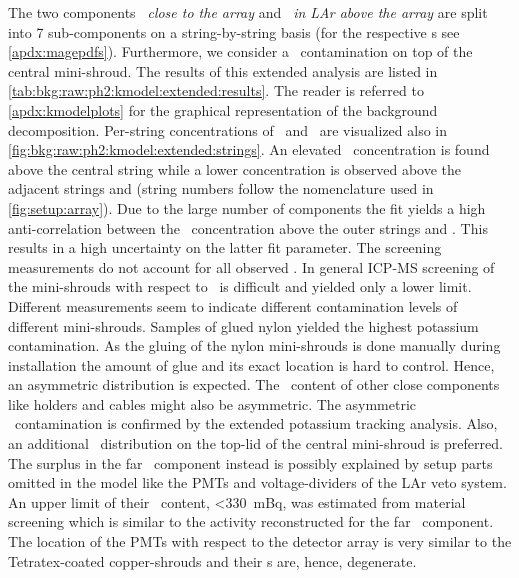 The two components \emph{\kvn\ close to the array} and \emph{\kvz\ in LAr above the array}
are split into 7 sub-components on a string-by-string basis (for the respective \pdf{}s see
\cref{apdx:magepdfs}). Furthermore, we consider a \kvn\ contamination on top of the
central mini-shroud.  The results of this extended analysis are listed in
\cref{tab:bkg:raw:ph2:kmodel:extended:results}. The reader is referred to
\cref{apdx:kmodelplots} for the graphical representation of the background decomposition.
Per-string concentrations of \kvn\ and \kvz\ are visualized also in
\cref{fig:bkg:raw:ph2:kmodel:extended:strings}.  An elevated \kvz\ concentration is found
above the central string while a lower concentration is observed above the adjacent
strings  and  (string numbers follow the nomenclature used in
\cref{fig:setup:array}). Due to the large number of components the fit yields a high
anti-correlation between the \kvz\ concentration above the outer strings and . This
results in a high uncertainty on the latter fit parameter.
\newpar
The screening measurements do not account for all observed \kvn. In general ICP-MS
screening of the mini-shrouds with respect to \kvn\ is difficult and yielded only a lower
limit. Different measurements seem to indicate different contamination levels of different
mini-shrouds.  Samples of glued nylon yielded the highest potassium contamination. As the
gluing of the nylon mini-shrouds is done manually during installation the amount of glue
and its exact location is hard to control. Hence, an asymmetric distribution is expected.
The \kvn\ content of other close components like holders and cables might also be
asymmetric. The asymmetric \kvn\ contamination is confirmed by the extended potassium
tracking analysis. Also, an additional \kvn\ distribution on the top-lid of the central
mini-shroud is preferred.  The surplus in the far \kvn\ component instead is possibly explained
by setup parts omitted in the model like the PMTs and voltage-dividers of the LAr veto
system. An upper limit of their \kvn\ content, <330~mBq, was estimated from material
screening which is similar to the activity reconstructed for the far \kvn\ component. The
location of the PMTs with respect to the detector array is very similar to the
Tetratex\reg-coated copper-shrouds and their \pdf{}s are, hence, degenerate.

\begin{table}
  \centering
  \caption{%
    Summary of the fit parameters estimated with the potassium source tracking analysis
    (extended model). The type of prior distribution is indicated with \m{[f]}: flat,
    \m{[g]}: Gaussian. ($\,^{\dagger}$ Tetratex\reg-coated)
  }\label{tab:bkg:raw:ph2:kmodel:extended:results}
  
\end{table}


